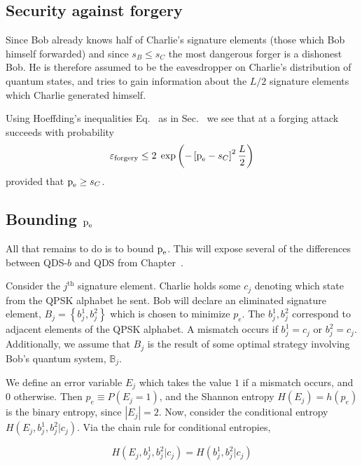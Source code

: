 \subsection{Security against forgery}
Since Bob already knows half of Charlie's signature elements (those which Bob himself forwarded) and since $s_B \le s_C$ the most dangerous forger is a dishonest Bob. He is therefore assumed to be the eavesdropper on Charlie's distribution of quantum states, and tries to gain information about the $L/2$ signature elements which Charlie generated himself.

Using Hoeffding's inequalities Eq.~ as in Sec.~ we see that at a forging attack succeeds with probability 
\begin{equation}\label{eqn:aqc_forgery}
\varepsilon_{\text{forgery}} \le 2 \; \exp\left( - \left[ \text{p}_{\text{e}} - s_C\right]^2 \frac{L}{2} \right)
\end{equation}
provided that $\text{p}_{\text{e}} \ge s_C$. 

\subsection{Bounding $\text{p}_{\text{e}}$}
All that remains to do is to bound $\text{p}_{\text{e}}$. This will expose several of the differences between QDS-$b$ and QDS from Chapter~.


Consider the $j^\text{th}$ signature element. Charlie holds some $c_j$ denoting which state from the QPSK alphabet he sent. Bob will declare an eliminated signature element, $B_j = \left\{b_j^1, b_j^2\right\}$ which is chosen to minimize $p_e$. The $b_j^1, b_j^2$ correspond to adjacent elements of the QPSK alphabet. A mismatch occurs if $b_j^1 = c_j$ or $b_j^2 = c_j$. Additionally, we assume that $B_j$ is the result of some optimal strategy involving Bob's quantum system, $\mathbb{B}_j$.

We define an error variable $E_j$ which takes the value $1$ if a mismatch occurs, and $0$ otherwise. Then $p_e \equiv P\left(E_j = 1\right)$, and the Shannon entropy $H\left(E_j\right) = h\left(p_e\right)$ is the binary entropy, since $|E_j| = 2$. Now, consider the conditional entropy $H\left(E_j, b_j^1, b_j^2 | c_j\right)$. Via the chain rule for conditional entropies,

\begin{equation*}
H\left(E_j, b_j^1, b_j^2 | c_j\right) = H\left(b_j^1, b_j^2 | c_j\right)
\end{equation*}

